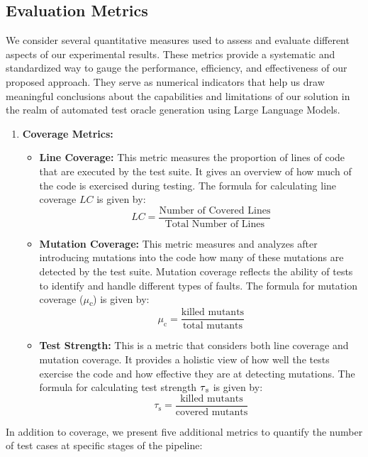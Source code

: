 \subsection{Evaluation Metrics}
\label{sec:evaluation_metrics}
\vspace{0.1 cm}
We consider several quantitative measures used to assess and evaluate different aspects of our experimental results. These metrics provide a systematic and standardized way to gauge the performance, efficiency, and effectiveness of our proposed approach. They serve as numerical indicators that help us draw meaningful conclusions about the capabilities and limitations of our solution in the realm of automated test oracle generation using Large Language Models.

    \begin{enumerate}
        \item \textbf{Coverage Metrics:}
        \begin{itemize}
            \item \textbf{Line Coverage:} This metric measures the proportion of lines of code that are executed by the test suite. It gives an overview of how much of the code is exercised during testing. The formula for calculating line coverage \(LC\) is given by:
\[
LC = \frac{\text{{Number of Covered Lines}}}{\text{{Total Number of Lines}}}
\]

            \item \textbf{Mutation Coverage:} This metric measures and analyzes after introducing mutations into the code how many of these mutations are detected by the test suite. Mutation coverage reflects the ability of tests to identify and handle different types of faults.
            The formula for mutation coverage ($\mu$\textsubscript{c}) is given by:
\[
\mu_{\text{c}} = \frac{\text{{killed mutants}}}{\text{{total mutants}}}
\]
            \item \textbf{Test Strength:} This is a metric that considers both line coverage and mutation coverage. It provides a holistic view of how well the tests exercise the code and how effective they are at detecting mutations. The formula for calculating test strength \(\tau\textsubscript{s}\) is given by:
\[
\tau_{\text{s}} = \frac{\text{{killed mutants}}}{\text{{covered mutants}}}
\]
        \end{itemize}
    \end{enumerate}

    In addition to coverage, we present five additional metrics to quantify the number of test cases at specific stages of the pipeline:

